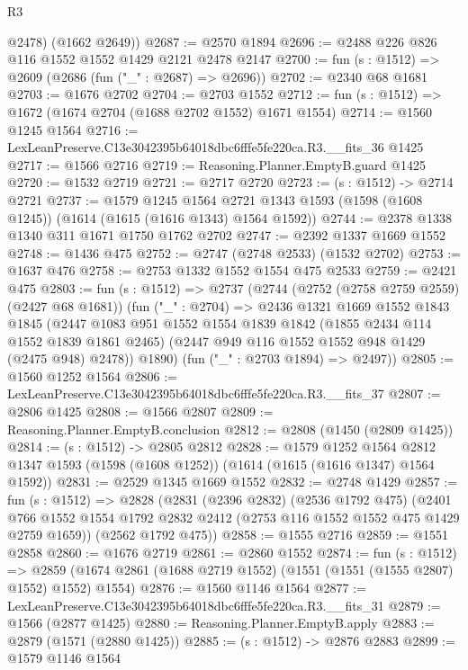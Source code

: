 \begin{lexlean}{R3}
\begin{coremodule}
        @2478)
      (@1662 @2649))
@2687 := @2570 @1894
@2696 := @2488 @226 @826 @116 @1552 @1552 @1429 @2121 @2478 @2147
@2700 := fun (s : @1512) => @2609 (@2686 (fun ("_" : @2687) => @2696))
@2702 := @2340 @68 @1681
@2703 := @1676 @2702
@2704 := @2703 @1552
@2712 := fun (s : @1512) => @1672 (@1674 @2704 (@1688 @2702 @1552) @1671 @1554)
@2714 := @1560 @1245 @1564
@2716 := LexLeanPreserve.C13e3042395b64018dbc6fffe5fe220ca.R3.__fits_36 @1425
@2717 := @1566 @2716
@2719 := Reasoning.Planner.EmptyB.guard @1425
@2720 := @1532 @2719
@2721 := @2717 @2720
@2723 := (s : @1512) -> @2714 @2721
@2737 := @1579
    @1245
    @1564
    @2721
    @1343
    @1593
    (@1598 (@1608 @1245))
    (@1614 (@1615 (@1616 @1343) @1564 @1592))
@2744 := @2378 @1338 @1340 @311 @1671 @1750 @1762 @2702
@2747 := @2392 @1337 @1669 @1552
@2748 := @1436 @475
@2752 := @2747 (@2748 @2533) (@1532 @2702)
@2753 := @1637 @476
@2758 := @2753 @1332 @1552 @1554 @475 @2533
@2759 := @2421 @475
@2803 := fun (s : @1512) =>
  @2737
    (@2744
      (@2752 (@2758 @2759 @2559) (@2427 @68 @1681))
      (fun ("_" : @2704) =>
      @2436
        @1321
        @1669
        @1552
        @1843
        @1845
        (@2447
          @1083
          @951
          @1552
          @1554
          @1839
          @1842
          (@1855 @2434 @114 @1552 @1839 @1861 @2465)
          (@2447 @949 @116 @1552 @1552 @948 @1429 (@2475 @948) @2478))
        @1890)
      (fun ("_" : @2703 @1894) => @2497))
@2805 := @1560 @1252 @1564
@2806 := LexLeanPreserve.C13e3042395b64018dbc6fffe5fe220ca.R3.__fits_37
@2807 := @2806 @1425
@2808 := @1566 @2807
@2809 := Reasoning.Planner.EmptyB.conclusion
@2812 := @2808 (@1450 (@2809 @1425))
@2814 := (s : @1512) -> @2805 @2812
@2828 := @1579
    @1252
    @1564
    @2812
    @1347
    @1593
    (@1598 (@1608 @1252))
    (@1614 (@1615 (@1616 @1347) @1564 @1592))
@2831 := @2529 @1345 @1669 @1552
@2832 := @2748 @1429
@2857 := fun (s : @1512) =>
  @2828
    (@2831
      (@2396 @2832)
      (@2536 @1792 @475)
      (@2401 @766 @1552 @1554 @1792 @2832 @2412 (@2753 @116 @1552 @1552 @475 @1429 @2759 @1659))
      (@2562 @1792 @475))
@2858 := @1555 @2716
@2859 := @1551 @2858
@2860 := @1676 @2719
@2861 := @2860 @1552
@2874 := fun (s : @1512) =>
  @2859 (@1674 @2861 (@1688 @2719 @1552) (@1551 (@1551 (@1555 @2807) @1552) @1552) @1554)
@2876 := @1560 @1146 @1564
@2877 := LexLeanPreserve.C13e3042395b64018dbc6fffe5fe220ca.R3.__fits_31
@2879 := @1566 (@2877 @1425)
@2880 := Reasoning.Planner.EmptyB.apply
@2883 := @2879 (@1571 (@2880 @1425))
@2885 := (s : @1512) -> @2876 @2883
@2899 := @1579
    @1146
    @1564

\end{coremodule}
\end{lexlean}
